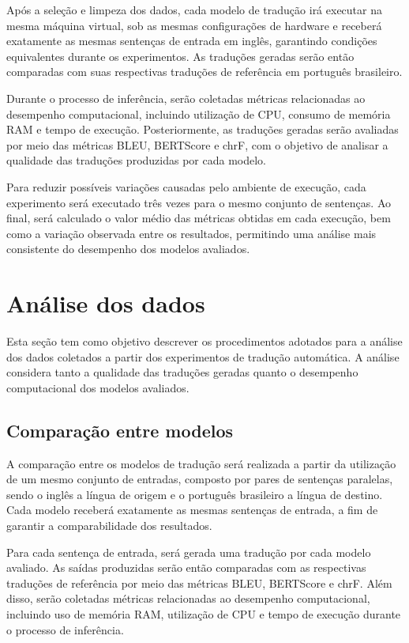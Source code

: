 Após a seleção e limpeza dos dados, cada modelo de tradução irá executar na mesma máquina virtual, sob as mesmas configurações de hardware e receberá exatamente as mesmas sentenças de entrada em inglês, garantindo condições equivalentes durante os experimentos. As traduções geradas serão então comparadas com suas respectivas traduções de referência em português brasileiro.

Durante o processo de inferência, serão coletadas métricas relacionadas ao desempenho computacional, incluindo utilização de CPU, consumo de memória RAM e tempo de execução. Posteriormente, as traduções geradas serão avaliadas por meio das métricas BLEU, BERTScore e chrF, com o objetivo de analisar a qualidade das traduções produzidas por cada modelo.

Para reduzir possíveis variações causadas pelo ambiente de execução, cada experimento será executado três vezes para o mesmo conjunto de sentenças. Ao final, será calculado o valor médio das métricas obtidas em cada execução, bem como a variação observada entre os resultados, permitindo uma análise mais consistente do desempenho dos modelos avaliados.


\section{Análise dos dados}

Esta seção tem como objetivo descrever os procedimentos adotados para a análise dos dados coletados a partir dos experimentos de tradução automática. A análise considera tanto a qualidade das traduções geradas quanto o desempenho computacional dos modelos avaliados.

\subsection{Comparação entre modelos}

A comparação entre os modelos de tradução será realizada a partir da utilização de um mesmo conjunto de entradas, composto por pares de sentenças paralelas, sendo o inglês a língua de origem e o português brasileiro a língua de destino. Cada modelo receberá exatamente as mesmas sentenças de entrada, a fim de garantir a comparabilidade dos resultados.

Para cada sentença de entrada, será gerada uma tradução por cada modelo avaliado. As saídas produzidas serão então comparadas com as respectivas traduções de referência por meio das métricas BLEU, BERTScore e chrF. Além disso, serão coletadas métricas relacionadas ao desempenho computacional, incluindo uso de memória RAM, utilização de CPU e tempo de execução durante o processo de inferência.


